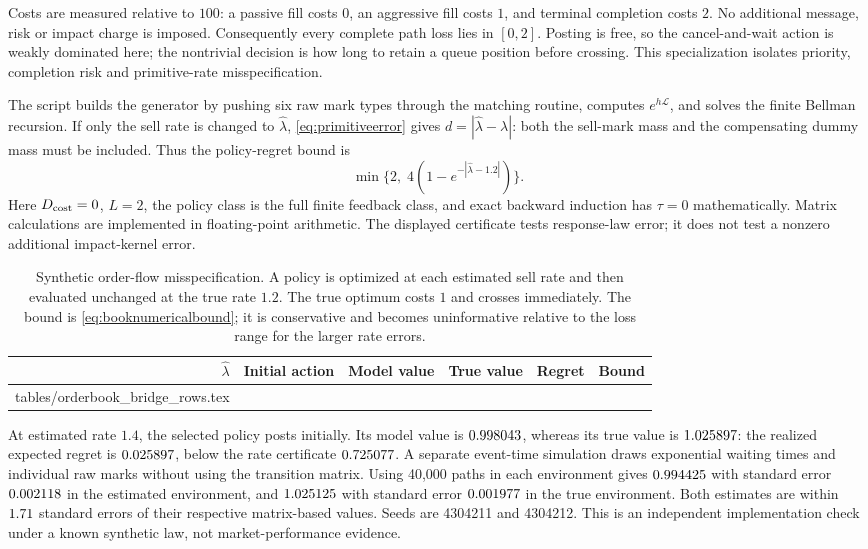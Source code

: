 \documentclass[11pt]{article}
\makeatletter
\numberwithin{equation}{section}
\theoremstyle{definition}
\theoremstyle{remark}
\theoremstyle{definition}
\newcommand{\inputtable}[1]{\@@input#1 }
\makeatother
\begin{document}
Costs are measured relative to $100$: a passive fill costs $0$, an aggressive
fill costs $1$, and terminal completion costs $2$. No additional message,
risk or impact charge is imposed. Consequently every complete path loss
lies in $[0,2]$. Posting is free, so the cancel-and-wait action is weakly
dominated here; the nontrivial decision is how long to retain a queue
position before crossing. This specialization isolates priority, completion
risk and primitive-rate misspecification.

The script builds the generator by pushing six raw mark types through the
matching routine, computes $e^{h\mathscr L}$, and solves the finite Bellman
recursion. If only the sell rate is changed to $\widehat\lambda$,
\eqref{eq:primitiveerror} gives $d=|\widehat\lambda-\lambda|$: both the
sell-mark mass and the compensating dummy mass must be included. Thus the
policy-regret bound is
\begin{equation}\label{eq:booknumericalbound}
 \min\{2,\;4(1-e^{-|\widehat\lambda-1.2|})\}.
\end{equation}
Here $D_{\rm cost}=0$, $L=2$, the policy class is the full finite feedback
class, and exact backward induction has $\tau=0$ mathematically. Matrix
calculations are implemented in floating-point arithmetic. The displayed
certificate tests response-law error; it does not test a nonzero additional
impact-kernel error.

\begin{table}[tb]
\centering\small
\caption{Synthetic order-flow misspecification. A policy is optimized at
each estimated sell rate and then evaluated unchanged at the true rate
$1.2$. The true optimum costs $1$ and crosses immediately. The bound is
\eqref{eq:booknumericalbound}; it is conservative and becomes uninformative
relative to the loss range for the larger rate errors.}
\label{tab:bookbridge}
\begin{tabular}{rlrrrr}
\toprule
$\widehat\lambda$ & Initial action & Model value & True value & Regret & Bound \\
\midrule
\inputtable{tables/orderbook_bridge_rows.tex}
\bottomrule
\end{tabular}
\end{table}

At estimated rate $1.4$, the selected policy posts initially. Its model
value is $0.998043$, whereas its true value is $1.025897$:
the realized expected regret is $0.025897$, below the rate certificate
$0.725077$. A separate event-time simulation draws exponential
waiting times and individual raw marks without using the transition matrix.
Using 40,000 paths in each environment gives $0.994425$ with standard
error $0.002118$ in the estimated environment, and $1.025125$
with standard error $0.001977$ in the true environment. Both estimates
are within $1.71$ standard errors of their respective matrix-based
values. Seeds are 4304211 and 4304212. This is an independent implementation
check under a known synthetic law, not market-performance evidence.
\end{document}
